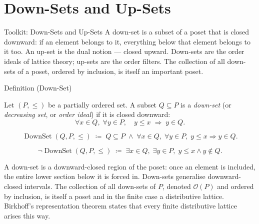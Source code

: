 
\section{Down-Sets and Up-Sets}
\label{sec:down-up-sets}

\begin{toolkitbox}{Toolkit: Down-Sets and Up-Sets}
A down-set is a subset of a poset that is closed downward: if an element
belongs to it, everything below that element belongs to it too.  An up-set
is the dual notion — closed upward.  Down-sets are the order ideals of
lattice theory; up-sets are the order filters.  The collection of all
down-sets of a poset, ordered by inclusion, is itself an important poset.
\end{toolkitbox}


\begin{definitionbox}{Definition (Down-Set)}
\begin{definition}
\label{def:down-set}
Let $(P, \leq)$ be a partially ordered set.  A subset $Q \subseteq P$ is
a \emph{down-set} (or \emph{decreasing set}, or \emph{order ideal}) if it
is closed downward:
\[
\forall x \in Q,\; \forall y \in P,\quad y \leq x \;\Longrightarrow\; y \in Q.
\]
\end{definition}
\end{definitionbox}

\begin{remark*}
\[
\operatorname{DownSet}(Q, P, \leq)
\;\coloneqq\;
Q \subseteq P
\;\land\;
\forall x \in Q,\; \forall y \in P,\;
y \leq x \Rightarrow y \in Q.
\]
\end{remark*}

\begin{remark*}
\[
\neg\operatorname{DownSet}(Q, P, \leq)
\;\coloneqq\;
\exists x \in Q,\; \exists y \in P,\;
y \leq x \land y \notin Q.
\]
\end{remark*}

\begin{remark*}[Interpretation]
A down-set is a downward-closed region of the poset: once an element is
included, the entire lower section below it is forced in.  Down-sets
generalise downward-closed intervals.  The collection of all down-sets of
$P$, denoted $\mathcal{O}(P)$ and ordered by inclusion, is itself a poset
and in the finite case a distributive lattice.  Birkhoff's representation
theorem states that every finite distributive lattice arises this way.
\end{remark*}


